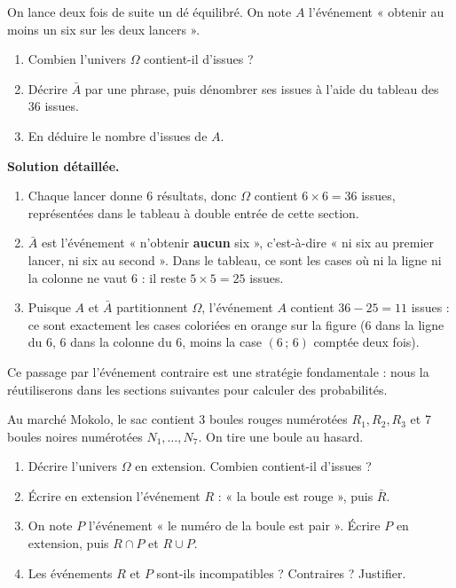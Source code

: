 \documentclass[11pt]{article}
\begin{document}
\begin{exoresolu}
On lance deux fois de suite un dé équilibré. On note $A$ l'événement « obtenir au moins un six sur les deux lancers ».
\begin{enumerate}
\item Combien l'univers $\Omega$ contient-il d'issues ?
\item Décrire $\bar{A}$ par une phrase, puis dénombrer ses issues à l'aide du tableau des 36 issues.
\item En déduire le nombre d'issues de $A$.
\end{enumerate}
\tcblower
\textbf{Solution détaillée.}
\begin{enumerate}
\item Chaque lancer donne 6 résultats, donc $\Omega$ contient $6 \times 6 = 36$ issues, représentées dans le tableau à double entrée de cette section.
\item $\bar{A}$ est l'événement « n'obtenir \textbf{aucun} six », c'est-à-dire « ni six au premier lancer, ni six au second ». Dans le tableau, ce sont les cases où ni la ligne ni la colonne ne vaut 6 : il reste $5 \times 5 = 25$ issues.
\item Puisque $A$ et $\bar{A}$ partitionnent $\Omega$, l'événement $A$ contient $36 - 25 = 11$ issues : ce sont exactement les cases coloriées en orange sur la figure (6 dans la ligne du 6, 6 dans la colonne du 6, moins la case $(6\,;\,6)$ comptée deux fois).
\end{enumerate}
Ce passage par l'événement contraire est une stratégie fondamentale : nous la réutiliserons dans les sections suivantes pour calculer des probabilités.
\end{exoresolu}

\begin{exercice}
Au marché Mokolo, le sac contient 3 boules rouges numérotées $R_1, R_2, R_3$ et 7 boules noires numérotées $N_1, \dots, N_7$. On tire une boule au hasard.
\begin{enumerate}
\item Décrire l'univers $\Omega$ en extension. Combien contient-il d'issues ?
\item Écrire en extension l'événement $R$ : « la boule est rouge », puis $\bar{R}$.
\item On note $P$ l'événement « le numéro de la boule est pair ». Écrire $P$ en extension, puis $R \cap P$ et $R \cup P$.
\item Les événements $R$ et $P$ sont-ils incompatibles ? Contraires ? Justifier.
\end{enumerate}
\end{exercice}
\end{document}
